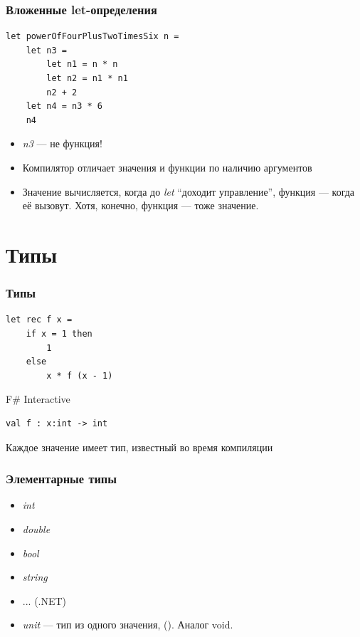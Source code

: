 \documentclass{../../slides-style}
\begin{document}
    \begin{frame}[fragile]
        \frametitle{Вложенные let-определения}
        \begin{verbatim}
let powerOfFourPlusTwoTimesSix n =
    let n3 =
        let n1 = n * n
        let n2 = n1 * n1
        n2 + 2
    let n4 = n3 * 6
    n4
        \end{verbatim}
        \begin{itemize}
            \item \textit{n3} --- не функция!
            \item Компилятор отличает значения и функции по наличию аргументов
            \item Значение вычисляется, когда до \textit{let} \enquote{доходит управление}, 
                    функция --- когда её вызовут. Хотя, конечно, функция --- тоже значение.
        \end{itemize}
    \end{frame}

    \section{Типы}

    \begin{frame}[fragile]
        \frametitle{Типы}
        \begin{verbatim}
let rec f x =
    if x = 1 then 
        1 
    else 
        x * f (x - 1)
        \end{verbatim}

        \begin{alertblock}{F\# Interactive}
            \begin{verbatim}
val f : x:int -> int
            \end{verbatim}
        \end{alertblock}
        Каждое значение имеет тип, известный во время компиляции
    \end{frame}

    \begin{frame}
        \frametitle{Элементарные типы}
        \begin{itemize}
            \item \textit{int}
            \item \textit{double}
            \item \textit{bool}
            \item \textit{string}
            \item ... (.NET)
            \item \textit{unit} --- тип из одного значения, (). Аналог void.
        \end{itemize}
    \end{frame}
    
\end{document}
